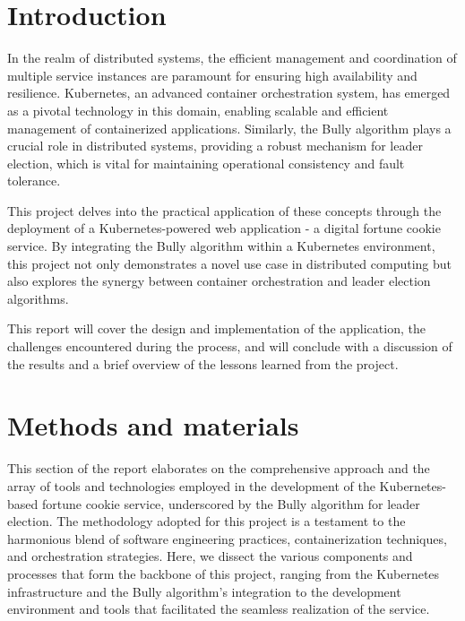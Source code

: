 \documentclass{article}
\begin{document}

\tableofcontents
\section{Introduction}
  In the realm of distributed systems, the efficient management and coordination of multiple service instances are paramount for ensuring high availability and resilience. Kubernetes, an advanced container orchestration system, has emerged as a pivotal technology in this domain, enabling scalable and efficient management of containerized applications. Similarly, the Bully algorithm plays a crucial role in distributed systems, providing a robust mechanism for leader election, which is vital for maintaining operational consistency and fault tolerance. 
  
  This project delves into the practical application of these concepts through the deployment of a Kubernetes-powered web application - a digital fortune cookie service. By integrating the Bully algorithm within a Kubernetes environment, this project not only demonstrates a novel use case in distributed computing but also explores the synergy between container orchestration and leader election algorithms. 
  
  This report will cover the design and implementation of the application, the challenges encountered during the process, and will conclude with a discussion of the results and a brief overview of the lessons learned from the project.
  \section{Methods and materials}
  This section of the report elaborates on the comprehensive approach and the array of tools and technologies employed in the development of the Kubernetes-based fortune cookie service, underscored by the Bully algorithm for leader election. The methodology adopted for this project is a testament to the harmonious blend of software engineering practices, containerization techniques, and orchestration strategies. Here, we dissect the various components and processes that form the backbone of this project, ranging from the Kubernetes infrastructure and the Bully algorithm's integration to the development environment and tools that facilitated the seamless realization of the service.
\end{document}
